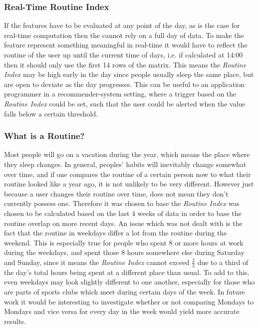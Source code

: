 \subsubsection*{Real-Time Routine Index}
If the features have to be evaluated at any point of the day, as is the case for real-time computation then the  cannot rely on a full day of data. To make the feature represent something meaningful in real-time it would have to reflect the routine of the user up until the current time of days, i.e. if calculated at 14:00 then it should only use the first 14 rows of the matrix. This means the \textit{Routine Index} may be high early in the day since people usually sleep the same place, but are open to deviate as the day progresses. This can be useful to an application programmer in a recommender-system setting, where a trigger based on the \textit{Routine Index} could be set, such that the user could be alerted when the value falls below a certain threshold.

\subsubsection*{What is a Routine?}
Most people will go on a vacation during the year, which means the place where they sleep changes. In general, peoples' habits will inevitably change somewhat over time, and if one compares the routine of a certain person now to what their routine looked like a year ago, it is not unlikely to be very different. However just because a user changes their routine over time, does not mean they don't currently possess one. Therefore it was chosen to base the \textit{Routine Index} was chosen to be calculated based on the last 4 weeks of data in order to base the routine overlap on more recent days. An issue which was not dealt with is the fact that the routine in weekdays differ a lot from the routine during the weekend. This is especially true for people who spent 8 or more hours at work during the weekdays, and spent those 8 hours somewhere else during Saturday and Sunday, since it means the \textit{Routine Index} cannot exceed $\frac{2}{3}$ due to a third of the day's total hours being spent at a different place than usual. To add to this, even weekdays may look slightly different to one another, especially for those who are parts of sports clubs which meet during certain days of the week. In future work it would be interesting to investigate whether or not comparing Mondays to Mondays and vice versa for every day in the week would yield more accurate results.

